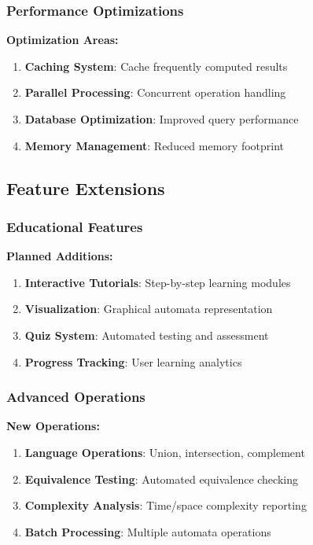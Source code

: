 \documentclass[12pt]{article}
\begin{document}
\subsubsection{Performance Optimizations}
\textbf{Optimization Areas:}
\begin{enumerate}
    \item \textbf{Caching System}: Cache frequently computed results
    \item \textbf{Parallel Processing}: Concurrent operation handling
    \item \textbf{Database Optimization}: Improved query performance
    \item \textbf{Memory Management}: Reduced memory footprint
\end{enumerate}

\subsection{Feature Extensions}

\subsubsection{Educational Features}
\textbf{Planned Additions:}
\begin{enumerate}
    \item \textbf{Interactive Tutorials}: Step-by-step learning modules
    \item \textbf{Visualization}: Graphical automata representation
    \item \textbf{Quiz System}: Automated testing and assessment
    \item \textbf{Progress Tracking}: User learning analytics
\end{enumerate}

\subsubsection{Advanced Operations}
\textbf{New Operations:}
\begin{enumerate}
    \item \textbf{Language Operations}: Union, intersection, complement
    \item \textbf{Equivalence Testing}: Automated equivalence checking
    \item \textbf{Complexity Analysis}: Time/space complexity reporting
    \item \textbf{Batch Processing}: Multiple automata operations
\end{enumerate}
\end{document}
